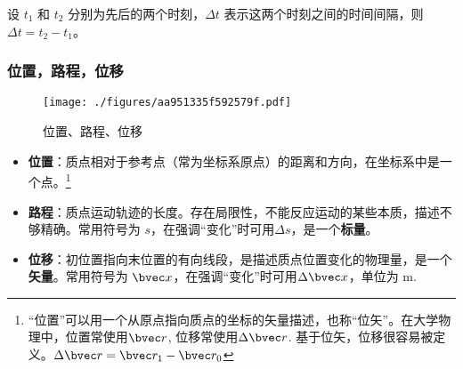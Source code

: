 设 $t_1$ 和 $t_2$ 分别为先后的两个时刻，$\Delta t$ 表示这两个时刻之间的时间间隔，则 $\Delta t = t_2 - t_1$。

\subsubsection{位置，路程，位移}
\begin{figure}[ht]
\centering
\texttt{[image: ./figures/aa951335f592579f.pdf]}
\caption{位置、路程、位移} \label{fig_HSPM01_3}
\end{figure}
\begin{itemize}
\item \textbf{位置}：质点相对于参考点（常为坐标系原点）的距离和方向，在坐标系中是一个点。\footnote{“位置”可以用一个从原点指向质点的坐标的矢量描述，也称“位矢”。在大学物理中，位置常使用$\bvec r$, 位移常使用$\Delta \bvec r$. 基于位矢，位移很容易被定义。$\Delta \bvec r = \bvec r_1 - \bvec r_0$}
\item \textbf{路程}：质点运动轨迹的长度。存在局限性，不能反应运动的某些本质，描述不够精确。常用符号为 $s$，在强调“变化”时可用$\Delta s$，是一个\textbf{标量}。
\item \textbf{位移}：初位置指向末位置的有向线段，是描述质点位置变化的物理量，是一个\textbf{矢量}。常用符号为 $\bvec x$，在强调“变化”时可用$\Delta \bvec x$，单位为 $\mathrm{m}$.
\end{itemize}

